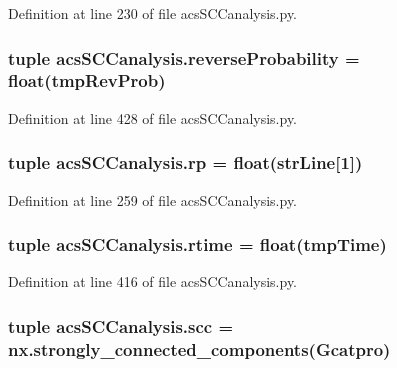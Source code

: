 Definition at line 230 of file acs\-S\-C\-Canalysis.\-py.

\hypertarget{a00097_aa7db2dba66810044f9c5238eccc995b7}{
\subsubsection[{reverse\-Probability}]{\setlength{\rightskip}{0pt plus 5cm}tuple acs\-S\-C\-Canalysis.\-reverse\-Probability = float(tmp\-Rev\-Prob)}}\label{a00097_aa7db2dba66810044f9c5238eccc995b7}


Definition at line 428 of file acs\-S\-C\-Canalysis.\-py.

\hypertarget{a00097_a98150f532e09ebae495212500d2f1799}{
\subsubsection[{rp}]{\setlength{\rightskip}{0pt plus 5cm}tuple acs\-S\-C\-Canalysis.\-rp = float({\bf str\-Line}\mbox{[}1\mbox{]})}}\label{a00097_a98150f532e09ebae495212500d2f1799}


Definition at line 259 of file acs\-S\-C\-Canalysis.\-py.

\hypertarget{a00097_a162a08b0497058c76e7e885c03a01336}{
\subsubsection[{rtime}]{\setlength{\rightskip}{0pt plus 5cm}tuple acs\-S\-C\-Canalysis.\-rtime = float(tmp\-Time)}}\label{a00097_a162a08b0497058c76e7e885c03a01336}


Definition at line 416 of file acs\-S\-C\-Canalysis.\-py.

\hypertarget{a00097_a2094b7f0917a16a948a2d1c4d700e84c}{
\subsubsection[{scc}]{\setlength{\rightskip}{0pt plus 5cm}tuple acs\-S\-C\-Canalysis.\-scc = nx.\-strongly\-\_\-connected\-\_\-components({\bf Gcatpro})}}\label{a00097_a2094b7f0917a16a948a2d1c4d700e84c}


